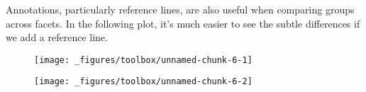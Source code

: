 Annotations, particularly reference lines, are also useful when
comparing groups across facets. In the following plot, it's much easier
to see the subtle differences if we add a reference line.

\begin{Shaded}
\begin{Highlighting}[]
\NormalTok{(}\OperatorTok{+}\StringTok{ }
\StringTok{  }\NormalTok{() }\OperatorTok{+}\StringTok{ }
\StringTok{  }\NormalTok{(}\OperatorTok{~} \NormalTok{)}
\end{Highlighting}
\end{Shaded}

\begin{figure}[H]
  \texttt{[image: \_figures/toolbox/unnamed-chunk-6-1]}%
\end{figure}

\begin{Shaded}
\begin{Highlighting}[]

\StringTok{ }\NormalTok{(}\NormalTok{(}\OperatorTok{~}\StringTok{ }
\NormalTok{(}\OperatorTok{+}\StringTok{ }
\StringTok{  }\NormalTok{() }\OperatorTok{+}\StringTok{ }
\StringTok{  }\NormalTok{(}\NormalTok{ mod_coef[}\NormalTok{], }\NormalTok{ mod_coef[}\NormalTok{], }
     \NormalTok{, } \NormalTok{) }\OperatorTok{+}\StringTok{ }
\StringTok{  }\NormalTok{(}\OperatorTok{~} \NormalTok{)}
\end{Highlighting}
\end{Shaded}

\begin{figure}[H]
  \texttt{[image: \_figures/toolbox/unnamed-chunk-6-2]}
\end{figure}

